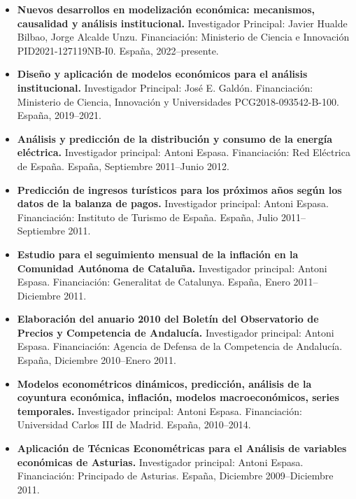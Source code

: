 \documentclass[11pt]{article}\usepackage[]{graphicx}\usepackage[usenames,dvipsnames]{xcolor}
\begin{document}
\begin{itemize}
  \item \textbf{Nuevos desarrollos en modelización económica: mecanismos, causalidad y análisis institucional.} Investigador Principal: Javier Hualde Bilbao, Jorge Alcalde Unzu. Financiación: Ministerio de Ciencia e Innovación PID2021-127119NB-I0. España, 2022--presente.

  \item \textbf{Diseño y aplicación de modelos económicos para el análisis institucional.} Investigador Principal: José E. Galdón. Financiación: Ministerio de Ciencia, Innovación y Universidades PCG2018-093542-B-100. España, 2019--2021.

\item \textbf{Análisis y predicción de la distribución y consumo de la energía eléctrica.} Investigador principal: Antoni Espasa. Financiación: Red Eléctrica de España. España, Septiembre 2011--Junio 2012.

\item \textbf{Predicción de ingresos turísticos para los próximos años según los datos de la balanza de pagos.} Investigador principal: Antoni Espasa. Financiación: Instituto de Turismo de España. España, Julio 2011--Septiembre 2011.

\item \textbf{Estudio para el seguimiento mensual de la inflación en la Comunidad Autónoma de Cataluña.} Investigador principal: Antoni Espasa. Financiación: Generalitat de Catalunya. España, Enero 2011--Diciembre 2011.

\item \textbf{Elaboración del anuario 2010 del Boletín del Observatorio de Precios y Competencia de Andalucía.} Investigador principal: Antoni Espasa. Financiación: Agencia de Defensa de la Competencia de Andalucía. España, Diciembre 2010--Enero 2011.

\item \textbf{Modelos econométricos dinámicos, predicción, análisis de la
coyuntura económica, inflación, modelos macroeconómicos, series temporales.} Investigador principal: Antoni Espasa. Financiación: Universidad Carlos III de Madrid. España, 2010--2014.

\item \textbf{Aplicación de Técnicas Econométricas para el Análisis de variables económicas de Asturias.} Investigador principal: Antoni Espasa. Financiación: Principado de Asturias. España, Diciembre 2009--Diciembre 2011.


\end{itemize}
\end{document}
